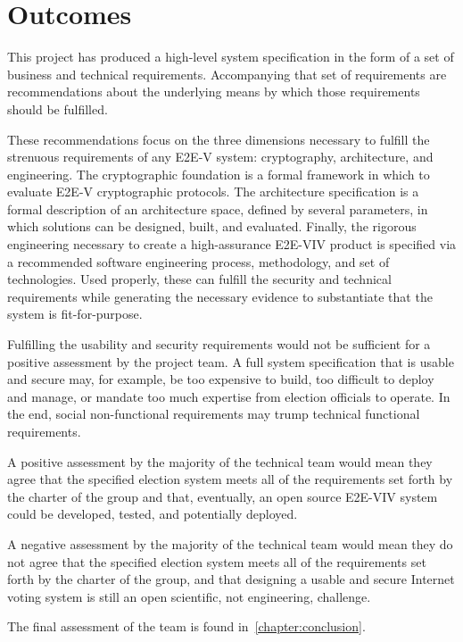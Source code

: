 \section{Outcomes}
\label{sec:outcomes}

This project has produced a high-level system specification in the
form of a set of business and technical requirements. Accompanying
that set of requirements are recommendations about the underlying
means by which those requirements should be fulfilled.

These recommendations focus on the three dimensions necessary to
fulfill the strenuous requirements of any E2E-V system: cryptography,
architecture, and engineering. The cryptographic foundation is a
formal framework in which to evaluate E2E-V cryptographic
protocols. The architecture specification is a formal description of
an architecture space, defined by several parameters, in which
solutions can be designed, built, and evaluated. Finally, the rigorous
engineering necessary to create a high-assurance E2E-VIV product is
specified via a recommended software engineering process, methodology,
and set of technologies. Used properly, these can fulfill the security
and technical requirements while generating the necessary evidence to
substantiate that the system is fit-for-purpose.

Fulfilling the usability and security requirements would not be
sufficient for a positive assessment by the project team. A full
system specification that is usable and secure may, for example, be
too expensive to build, too difficult to deploy and manage, or mandate
too much expertise from election officials to operate. In the end,
social non-functional requirements may trump technical functional
requirements. 

A positive assessment by the majority of the technical team would mean
they agree that the specified election system meets all of the
requirements set forth by the charter of the group and that,
eventually, an open source E2E-VIV system could be developed, tested,
and potentially deployed.

A negative assessment by the majority of the technical team would mean
they do not agree that the specified election system meets all of the
requirements set forth by the charter of the group, and that designing
a usable and secure Internet voting system is still an open
scientific, not engineering, challenge.

The final assessment of the team is found
in~\autoref{chapter:conclusion}.

